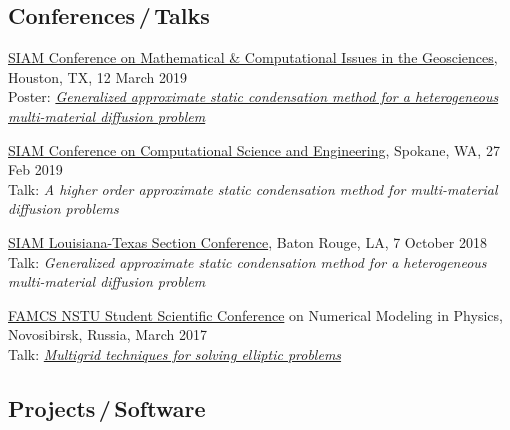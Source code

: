 \documentclass[a4paper,12pt]{article}
\begin{document}
	\subsection*{Conferences\,/\,Talks}
	
	\begin{etaremune}[topsep=0pt]
		\item \href{https://www.siam.org/Conferences/CM/Main/gs19}{SIAM Conference on Mathematical \& Computational Issues in the Geosciences}, Houston, TX, 12 March 2019\\
		      Poster: \textit{\href{https://www.researchgate.net/publication/331674777_Generalized_approximate_static_condensation_method_for_a_heterogeneous_multi-material_diffusion_problem}{Generalized approximate static condensation method for a heterogeneous multi-material diffusion problem}}
		\item \href{https://www.siam.org/Conferences/CM/Main/cse19}{SIAM Conference on Computational Science and Engineering}, Spokane, WA, 27 Feb 2019\\
		      Talk: \textit{A higher order approximate static condensation method for multi-material diffusion problems}
		\item \href{https://www.siam.org/Conferences/CM/Main/txla18}{SIAM Louisiana-Texas Section Conference}, Baton Rouge, LA, 7 October 2018\\
		      Talk: \textit{Generalized approximate static condensation method for a heterogeneous multi-material diffusion problem}
		\item \href{https://ami.nstu.ru/o-fakultete/news/1699/}{FAMCS NSTU Student Scientific Conference} on Numerical Modeling in Physics, Novosibirsk, Russia, March 2017\\
		      Talk: \textit{\href{https://www.researchgate.net/publication/316884102_Mnogosetocnye_metody_resenia_ellipticeskih_zadac}{Multigrid techniques for solving elliptic problems}}
	\end{etaremune}

	\subsection*{Projects\,/\,Software}
	
\end{document}
